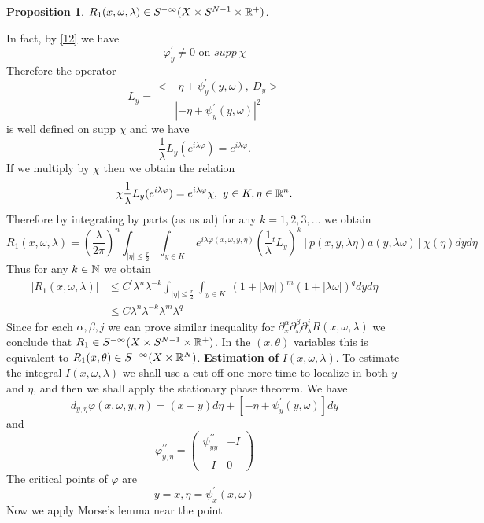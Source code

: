 \documentclass[12pt,reqno]{amsart}
\theoremstyle{plain}  %
\newtheorem{proposition}{Proposition}
\theoremstyle{definition}
\newcommand{\nin}{\noindent}
\newcommand{\vph}{\varphi}
\begin{document}
\begin{proposition}  $ R_1(x, \omega, \lambda) \in S^{- \infty} (X \times S^{N-1}
\times \Bbb R^+)$.  
\end{proposition}
\nin
In fact, by \eqref{12} we have
$$\vph^\prime_y \ne 0 \text{ on } supp\  \chi$$
\vskip0.1in
\nin
Therefore the operator
$$L_y =  \frac{<- \eta + \psi^\prime_y (y, \omega), \ D_y>}{|-
\eta + \psi^\prime_y (y, \omega)|^2} $$
is well defined on supp $ \chi $ and we have
$$\frac{1}{\lambda} L_y (e^{i \lambda \vph}) = e^{i \lambda \vph}. $$
If we multiply by   $\chi $ then we obtain the relation
$$ \chi \frac{1}{\lambda}  L_y (e^{i \lambda \vph}) = e^{i \lambda \vph} \chi, \
y \in K, \eta \in \Bbb R^n.$$
Therefore by integrating by parts (as usual) for any $ k = 1, 2, 3, \dots $ we
obtain
$$R_1(x, \omega, \lambda) = \left ( \frac{\lambda}{2 \pi} \right )^n \int_{|\eta|
\le \frac{r}{2}} \int_{y \in K}\  e^{i \lambda \vph (x, \omega, y, \eta)}
\left (\frac{1}{\lambda} {}^tL_y \right )^k [p(x, y, \lambda \eta) a (y, \lambda
\omega)] \chi (\eta) dy d \eta$$ 
Thus for any $ k  \in \Bbb N $ we obtain
\begin{align}
|R_1(x, \omega, \lambda)| &\le C^\prime \lambda^n \lambda^{-k}
\int_{|\eta| \le \frac{r}{2}} \int_{y \in K} \ (1 + |\lambda \eta|)^m (1 + |\lambda
\omega|)^q dy d\eta\\
&\le C \lambda^n \lambda^{-k} \lambda^m \lambda^q \end{align}
Since for each $ \alpha, \beta, j  $ we can prove similar inequality for $
\partial^\alpha_x \partial^\beta_\omega \partial^j_\lambda R(x, \omega,
\lambda) $ we conclude that $ R_1 \in S^{- \infty} (X \times S^{N-1}\times \Bbb
R^+) $. In the $ (x, \theta) $
variables this is equivalent to $ R_1(x, \theta) \in S^{- \infty} (X \times \Bbb
R^N)$. \vskip0.1in
\nin
{\bf Estimation of} \boldmath $I(x, \omega, \lambda).$ 
\unboldmath
To estimate the integral $ I(x, \omega,
\lambda) $ we shall use a cut-off one more time to localize in both $ y $ and $
\eta$,  and then we shall apply the stationary phase theorem.  We have $$d_{y,
\eta} \vph (x, \omega, y, \eta) = (x-y) d \eta + \left [- \eta + \psi^\prime_y (y,
\omega) \right ] dy$$ and
$$\vph^{\prime \prime}_{y, \eta} = \begin{pmatrix}
\psi^{\prime \prime}_{yy} &-I\\
\\
-I &0 \end{pmatrix}$$
The critical points of $ \vph $ are
$$y = x, \eta = \psi^\prime_x (x, \omega)$$
Now we apply Morse's lemma near the point
\end{document}
